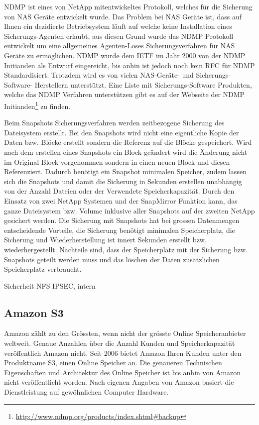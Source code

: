 NDMP ist eines von NetApp mitentwickeltes Protokoll, welches für die Sicherung von NAS Geräte entwickelt wurde. Das Problem bei NAS Geräte ist, dass auf Ihnen ein dezidierte Betriebsystem läuft auf welche keine Installation eines Sicherungs-Agenten erlaubt, aus diesen Grund wurde das NDMP Protokoll entwickelt um eine allgemeines Agenten-Loses Sicherungsverfahren für NAS Geräte zu ermöglichen. NDMP wurde dem IETF im Jahr 2000 von der NDMP Initianden als Entwurf eingereicht, bis anhin ist jedoch noch kein RFC für NDMP Standardisiert. Trotzdem wird es von vielen NAS-Geräte- und Sicherungs-Software- Herstellern unterstützt. Eine Liste mit Sicherungs-Software Produkten, welche das NDMP Verfahren unterstützen gibt es auf der Webseite der NDMP Initianden\footnote{\url{http://www.ndmp.org/products/index.shtml#backup}} zu finden.\cite{NDMP.orga}\cite{NDMP.org}

Beim Snapshots Sicherungsverfahren werden zeitbezogene Sicherung des Dateisystem  erstellt. Bei den Snapshots wird nicht eine eigentliche Kopie der Daten bzw. Blöcke erstellt sondern die Referenz auf die Blöcke gespeichert. Wird nach dem erstellen eines Snapshots ein Block geändert wird die Änderung nicht im Original Block vorgenommen sondern in einen neuen Block und diesen Referenziert. Dadurch benötigt ein Snapshot minimalen Speicher, zudem lassen sich die Snapshots und damit die Sicherung in Sekunden erstellen unabhängig von der Anzahl Dateien oder der Verwendete Speicherkapazität. Durch den Einsatz von zwei NetApp Systemen und der SnapMirror Funktion kann, das ganze Dateisystem bzw. Volume inklusive aller Snapshots auf der zweiten NetApp gesichert werden. Die Sicherung mit Snapshots hat bei grossen Datenmengen entscheidende Vorteile, die Sicherung benötigt minimalen Speicherplatz, die Sicherung und Wiederherstellung ist innert Sekunden erstellt bzw. wiederhergestellt. Nachteile sind, dass der Speicherplatz mit der Sicherung bzw. Snapshots geteilt werden muss und das löschen der Daten zusätzlichen Speicherplatz verbraucht.

Sicherheit NFS IPSEC, intern

\subsection{Amazon S3}
Amazon zählt zu den Grössten, wenn nicht der grösste Online Speicheranbieter weltweit. Genaue Anzahlen über die Anzahl Kunden und Speicherkapazität veröffentlich Amazon nicht. Seit 2006 bietet Amazon Ihren Kunden unter den Produktname S3, einen Online Speicher an. Die genaueren Technischen Eigenschaften und Architektur des Online Speicher ist bis anhin von Amazon nicht veröffentlicht worden. Nach eigenen Angaben von Amazon basiert die Dienstleistung auf gewöhnlichen Computer Hardware.

